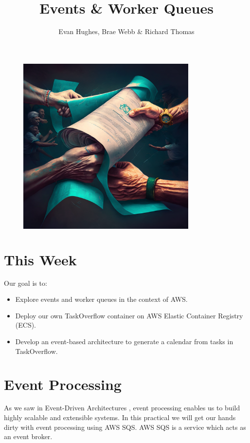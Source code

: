 \documentclass{csse4400}
\title{Events \& Worker Queues}
\author{Evan Hughes, Brae Webb \& Richard Thomas}
\date{\week[practical]{7}}
\begin{document}
\maketitle

\begin{figure}[ht]
    \centering
    \includegraphics[width=0.8\textwidth]{images/event-driven}
\end{figure}


\section{This Week}
Our goal is to:
\begin{itemize}
    \item Explore events and worker queues in the context of AWS.
    \item Deploy our own TaskOverflow container on AWS Elastic Container Registry (ECS).
    \item Develop an event-based architecture to generate a calendar from tasks in TaskOverflow.
\end{itemize}

\section{Event Processing}

As we saw in Event-Driven Architectures \cite{events-notes},
event processing enables us to build highly scalable and extensible systems.
In this practical we will get our hands dirty with event processing using AWS SQS.
AWS SQS is a service which acts as an event broker.
\end{document}
